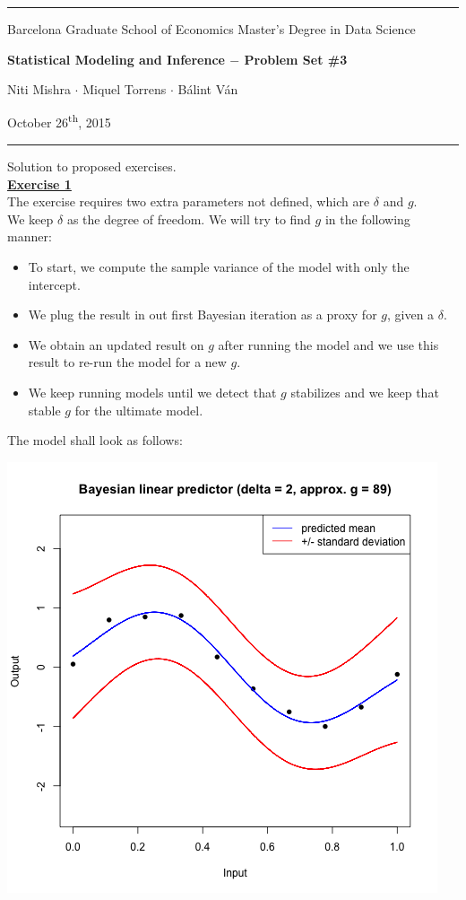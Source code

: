 \documentclass[a4paper, 11pt]{article}
\newcommand{\header}[4]{
	\begin{center}
		\rule{\linewidth}{0.5pt}
		
		{\small{#1}}
      
        \vspace{0.2in}
        
		{\large{#2}}
		
        \vspace{0.2in}
        
		{\small{#3}}
		
		\vspace{0.15in}
		
		{#4}
		
		\vspace{-0.1in}
		\rule{\linewidth}{0.6pt}
	\end{center}
}
\begin{document}
 
\header{\sc Barcelona Graduate School of Economics \hfill Master's Degree in Data Science}{\bf Statistical Modeling and Inference $-$ Problem Set \#3}{\sc Niti Mishra $\cdot$ Miquel Torrens $\cdot$ B\'alint V\'an}{October 26\textsuperscript{th}, 2015}
Solution to proposed exercises.\\
\newline \textbf{\underline{Exercise 1}}\\
\newline The exercise requires two extra parameters not defined, which are $\delta$ and $g$.\\
\newline We keep $\delta$ as the degree of freedom. We will try to find $g$ in the following manner:
\begin{itemize}
\item To start, we compute the sample variance of the model with only the intercept.
\item We plug the result in out first Bayesian iteration as a proxy for $g$, given a $\delta$.
\item We obtain an updated result on $g$ after running the model and we use this result to re-run the model for a new $g$.
\item We keep running models until we detect that $g$ stabilizes and we keep that stable $g$ for the ultimate model.
\end{itemize}
The model shall look as follows:\\
\begin{center}
\includegraphics[scale=0.6]{ps3F_plot1.png}
\end{center}
\end{document}
